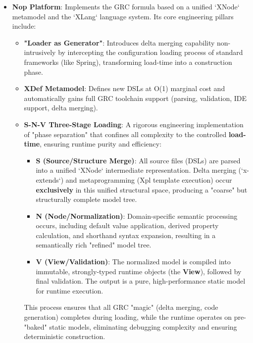 \documentclass[11pt]{article}
\begin{document}
\begin{itemize}
    \item \textbf{Nop Platform}: Implements the GRC formula based on a unified `XNode` metamodel and the `XLang` language system. Its core engineering pillars include:
    \begin{itemize}
        \item \textbf{"Loader as Generator"}: Introduces delta merging capability non-intrusively by intercepting the configuration loading process of standard frameworks (like Spring), transforming load-time into a construction phase.
        \item \textbf{XDef Metamodel}: Defines new DSLs at O(1) marginal cost and automatically gains full GRC toolchain support (parsing, validation, IDE support, delta merging).
        \item \textbf{S-N-V Three-Stage Loading}: A rigorous engineering implementation of "phase separation" that confines all complexity to the controlled \textbf{load-time}, ensuring runtime purity and efficiency:
        \begin{itemize}
            \item \textbf{S (Source/Structure Merge)}: All source files (DSLs) are parsed into a unified `XNode` intermediate representation. Delta merging (`x-extends`) and metaprogramming (Xpl template execution) occur \textbf{exclusively} in this unified structural space, producing a "coarse" but structurally complete model tree.
            \item \textbf{N (Node/Normalization)}: Domain-specific semantic processing occurs, including default value application, derived property calculation, and shorthand syntax expansion, resulting in a semantically rich "refined" model tree.
            \item \textbf{V (View/Validation)}: The normalized model is compiled into immutable, strongly-typed runtime objects (the \textbf{View}), followed by final validation. The output is a pure, high-performance static model for runtime execution.
        \end{itemize}
        This process ensures that all GRC "magic" (delta merging, code generation) completes during loading, while the runtime operates on pre-"baked" static models, eliminating debugging complexity and ensuring deterministic construction.
    \end{itemize}
    

\end{itemize}
\end{document}
